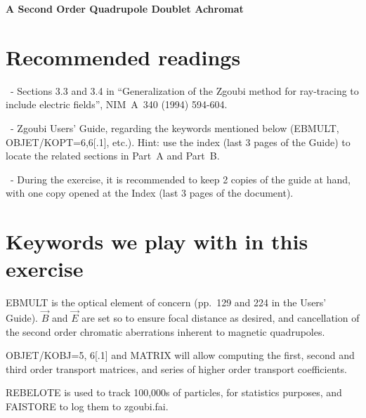 \documentclass[10pt]{article}
\newcommand{\nin}{\noindent~}
\begin{document}
\thispagestyle{empty}

\begin{minipage}{1.\linewidth}
\bf
\vspace{-2ex}
  
\vspace{-2ex}
  
\vspace{-2ex}
  
\end{minipage}


\vspace{5ex}

\centerline{\LARGE \bf
 A Second Order Quadrupole Doublet Achromat
}


\section*{Recommended readings}

\nin - Sections 3.3 and 3.4 in 
``Generalization of the Zgoubi method for ray-tracing to include electric fields'',  NIM~A~340 (1994) 594-604. 

\smallskip
\nin - Zgoubi Users' Guide, regarding the keywords mentioned below (EBMULT, OBJET/KOPT=6,6[.1], etc.). Hint: use the index (last 3 pages of the Guide) to locate the related sections in Part~A and Part~B.


\smallskip
\nin - During the exercise, it is recommended to keep 2 copies of the guide at hand, with one copy opened at the Index (last 3 pages of the document).


\section*{Keywords we play with in this exercise}

EBMULT is the optical element of concern  (pp.~129 and 224 in the Users' Guide).  $ \vec B$ and $ \vec E$ are set so to ensure
focal distance as desired, and cancellation of the second order chromatic aberrations inherent to magnetic quadrupoles.

\smallskip
\noindent OBJET/KOBJ=5, 6[.1] and MATRIX will allow computing the first, second and third order transport matrices,
and series of higher order transport coefficients. 

\smallskip
\noindent REBELOTE is used to track 100,000s of particles, for statistics purposes, and FAISTORE to log them to zgoubi.fai.
\end{document}
